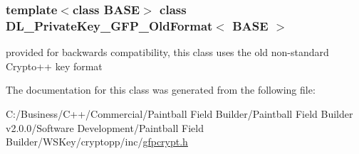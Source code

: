 \subsubsection*{template$<$class BASE$>$ class DL\_\-PrivateKey\_\-GFP\_\-OldFormat$<$ BASE $>$}

provided for backwards compatibility, this class uses the old non-\/standard Crypto++ key format 

The documentation for this class was generated from the following file:\begin{DoxyCompactItemize}
\item 
C:/Business/C++/Commercial/Paintball Field Builder/Paintball Field Builder v2.0.0/Software Development/Paintball Field Builder/WSKey/cryptopp/inc/\hyperlink{gfpcrypt_8h}{gfpcrypt.h}\end{DoxyCompactItemize}
